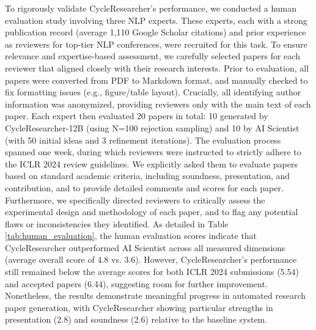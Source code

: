 \documentclass{article} %
\begin{document}
To rigorously validate CycleResearcher's performance, we conducted a human evaluation study involving three NLP experts. These experts, each with a strong publication record (average 1,110 Google Scholar citations) and prior experience as reviewers for top-tier NLP conferences, were recruited for this task. To ensure relevance and expertise-based assessment, we carefully selected papers for each reviewer that aligned closely with their research interests. Prior to evaluation, all papers were converted from PDF to Markdown format, and manually checked to fix formatting issues (e.g., figure/table layout). Crucially, all identifying author information was anonymized, providing reviewers only with the main text of each paper. Each expert then evaluated 20 papers in total: 10 generated by CycleResearcher-12B (using N=100 rejection sampling) and 10 by AI Scientist (with 50 initial ideas and 3 refinement iterations). The evaluation process spanned one week, during which reviewers were instructed to strictly adhere to the ICLR 2024 review guidelines. We explicitly asked them to evaluate papers based on standard academic criteria, including soundness, presentation, and contribution, and to provide detailed comments and scores for each paper. Furthermore, we specifically directed reviewers to critically assess the experimental design and methodology of each paper, and to flag any potential flaws or inconsistencies they identified. As detailed in Table \ref{tab:human_evaluation}, the human evaluation scores indicate that CycleResearcher outperformed AI Scientist across all measured dimensions (average overall score of 4.8 vs. 3.6). However, CycleResearcher's performance still remained below the average scores for both ICLR 2024 submissions (5.54) and accepted papers (6.44), suggesting room for further improvement. Nonetheless, the results demonstrate meaningful progress in automated research paper generation, with CycleResearcher showing particular strengths in presentation (2.8) and soundness (2.6) relative to the baseline system.
\end{document}
